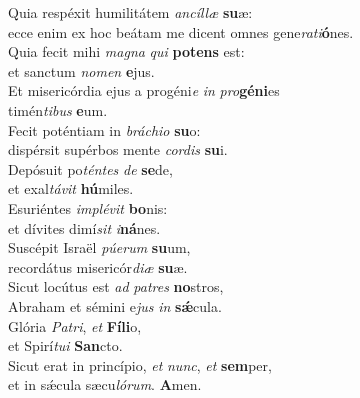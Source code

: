 \oddverse Quia respéxit humilitátem \textit{an}\textit{cíl}\textit{læ} \textbf{su}æ:~\*\\
\oddverse ecce enim ex hoc beátam me dicent omnes gene\textit{ra}\textit{ti}\textbf{ó}nes.\\
\evenverse Quia fecit mihi \textit{ma}\textit{gna} \textit{qui} \textbf{po}\textbf{tens} est:~\*\\
\evenverse et sanctum \textit{no}\textit{men} \textbf{e}jus.\\
\oddverse Et misericórdia ejus a progéni\textit{e} \textit{in} \textit{pro}\textbf{gé}\textbf{ni}es~\*\\
\oddverse timén\textit{ti}\textit{bus} \textbf{e}um.\\
\evenverse Fecit poténtiam in \textit{brá}\textit{chi}\textit{o} \textbf{su}o:~\*\\
\evenverse dispérsit supérbos mente \textit{cor}\textit{dis} \textbf{su}i.\\
\oddverse Depósuit po\textit{tén}\textit{tes} \textit{de} \textbf{se}de,~\*\\
\oddverse et exal\textit{tá}\textit{vit} \textbf{hú}miles.\\
\evenverse Esuriéntes \textit{im}\textit{plé}\textit{vit} \textbf{bo}nis:~\*\\
\evenverse et dívites dimí\textit{sit} \textit{i}\textbf{ná}nes.\\
\oddverse Suscépit Israël \textit{pú}\textit{e}\textit{rum} \textbf{su}um,~\*\\
\oddverse recordátus misericór\textit{di}\textit{æ} \textbf{su}æ.\\
\evenverse Sicut locútus est \textit{ad} \textit{pa}\textit{tres} \textbf{no}stros,~\*\\
\evenverse Abraham et sémini e\textit{jus} \textit{in} \textbf{sǽ}cula.\\
\oddverse Glória \textit{Pa}\textit{tri}, \textit{et} \textbf{Fí}\textbf{li}o,~\*\\
\oddverse et Spirí\textit{tu}\textit{i} \textbf{San}cto.\\
\evenverse Sicut erat in princípio, \textit{et} \textit{nunc}, \textit{et} \textbf{sem}per,~\*\\
\evenverse et in sǽcula sæcu\textit{ló}\textit{rum}. \textbf{A}men.\\
